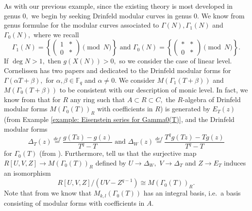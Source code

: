 \documentclass[11pt]{amsart}
\theoremstyle{definition}
\numberwithin{equation}{section}
\newcommand{\bbF}{\mathbb{F}}		%
\begin{document}
As with our previous example, since the existing theory is most developed in genus $0,$ we begin by seeking Drinfeld modular curves in genus $0.$ We know from \cite[Theorem $8.1$]{Gekeler-Invariants} genus formulae for the modular curves associated to $\Gamma(N), \Gamma_1(N)$ and $\Gamma_0(N),$ where we recall \[\Gamma_1(N)=\left\{\left(\begin{array}{cc}1&*\\0&*\end{array}\right)\pmod{N}\right\}\text{ and } \Gamma_0(N)=\left\{\left(\begin{array}{cc}*&*\\0&*\end{array}\right)\pmod{N}\right\}.\] If $\deg N>1,$ then $g(X(N))>0,$ so we consider the case of linear level. Cornelissen has two papers \cite{Cornelissen-lvlT} and \cite{Cornelissen-wt1} dedicated to the Drinfeld modular forms for $\Gamma(\alpha T+\beta),$ for $\alpha,\beta\in \bbF_q$ and $\alpha\neq 0.$ We consider
$M(\Gamma_1(T+\beta)) $ and $M(\Gamma_0(T+\beta))$ to be consistent with our description of monic level.
In fact, we know from \cite[Theorem $4.4$]{Dalal-Kumar-Gamma_0(T)-structure} that for $R$ any ring such that $A\subset R\subset C,$ the $R$-algebra of Drinfeld modular forms $M(\Gamma_0(T))_R$ with coefficients in $R$) is generated by $E_T(z)$ (from Example \ref{example: Eisenstein series for Gamma0(T)}, and the Drinfeld modular forms
\[\Delta_T(z)\overset{def}{=}\frac{g(Tz)-g(z)}{T^q-T} \text{ and }\Delta_W(z)\overset{def}{=}\frac{T^qg(Tz)-Tg(z)}{T^q-T}\]
for $\Gamma_0(T)$ (from \cite[Equation $(4.1)$]{Dalal-Kumar-Gamma_0(T)-structure}). Furthermore, \cite[Theorem $4.4$]{Dalal-Kumar-Gamma_0(T)-structure} tell us that the surjective map 
$R[U,V,Z]\to M(\Gamma_0(T))_R$ defined by $U\to \Delta_W,$ $V\to \Delta_T$ and $Z\to E_T$ induces an isomorphism 
\[R[U,V,Z]/(UV-Z^{q-1})\cong M(\Gamma_0(T))_R.\] Note that from \cite[Proposition $4.3(3)$]{Dalal-Kumar-Gamma_0(T)-structure} we know that $M_{k,l}(\Gamma_0(T))$ has an integral basis, i.e.\ a basis consisting of modular forms with coefficients in $A.$\\
\end{document}
